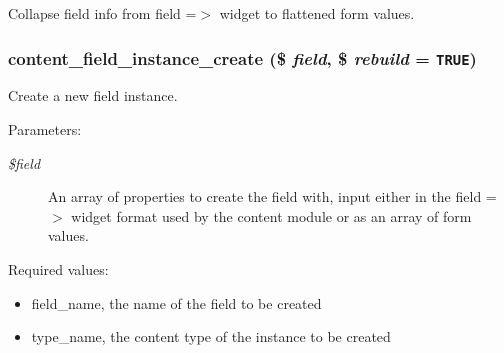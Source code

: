 Collapse field info from field =$>$ widget to flattened form values. \hypertarget{content_8crud_8inc_b0b54752706eb5a68be6ae4f329faca2}{
\subsubsection[{content\_\-field\_\-instance\_\-create}]{\setlength{\rightskip}{0pt plus 5cm}content\_\-field\_\-instance\_\-create (\$ {\em field}, \/  \$ {\em rebuild} = {\tt TRUE})}}
\label{content_8crud_8inc_b0b54752706eb5a68be6ae4f329faca2}


Create a new field instance.

\begin{Desc}
\item[Parameters:]
\begin{description}
\item[{\em \$field}]An array of properties to create the field with, input either in the field =$>$ widget format used by the content module or as an array of form values.\end{description}
\end{Desc}
Required values:\begin{itemize}
\item field\_\-name, the name of the field to be created\item type\_\-name, the content type of the instance to be created\end{itemize}


